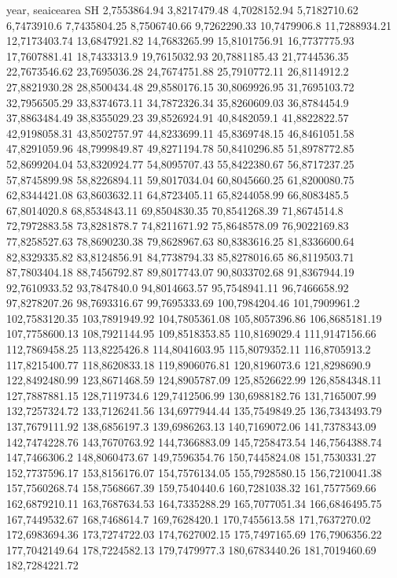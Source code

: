 year,    seaicearea SH
2,7553864.94
3,8217479.48
4,7028152.94
5,7182710.62
6,7473910.6
7,7435804.25
8,7506740.66
9,7262290.33
10,7479906.8
11,7288934.21
12,7173403.74
13,6847921.82
14,7683265.99
15,8101756.91
16,7737775.93
17,7607881.41
18,7433313.9
19,7615032.93
20,7881185.43
21,7744536.35
22,7673546.62
23,7695036.28
24,7674751.88
25,7910772.11
26,8114912.2
27,8821930.28
28,8500434.48
29,8580176.15
30,8069926.95
31,7695103.72
32,7956505.29
33,8374673.11
34,7872326.34
35,8260609.03
36,8784454.9
37,8863484.49
38,8355029.23
39,8526924.91
40,8482059.1
41,8822822.57
42,9198058.31
43,8502757.97
44,8233699.11
45,8369748.15
46,8461051.58
47,8291059.96
48,7999849.87
49,8271194.78
50,8410296.85
51,8978772.85
52,8699204.04
53,8320924.77
54,8095707.43
55,8422380.67
56,8717237.25
57,8745899.98
58,8226894.11
59,8017034.04
60,8045660.25
61,8200080.75
62,8344421.08
63,8603632.11
64,8723405.11
65,8244058.99
66,8083485.5
67,8014020.8
68,8534843.11
69,8504830.35
70,8541268.39
71,8674514.8
72,7972883.58
73,8281878.7
74,8211671.92
75,8648578.09
76,9022169.83
77,8258527.63
78,8690230.38
79,8628967.63
80,8383616.25
81,8336600.64
82,8329335.82
83,8124856.91
84,7738794.33
85,8278016.65
86,8119503.71
87,7803404.18
88,7456792.87
89,8017743.07
90,8033702.68
91,8367944.19
92,7610933.52
93,7847840.0
94,8014663.57
95,7548941.11
96,7466658.92
97,8278207.26
98,7693316.67
99,7695333.69
100,7984204.46
101,7909961.2
102,7583120.35
103,7891949.92
104,7805361.08
105,8057396.86
106,8685181.19
107,7758600.13
108,7921144.95
109,8518353.85
110,8169029.4
111,9147156.66
112,7869458.25
113,8225426.8
114,8041603.95
115,8079352.11
116,8705913.2
117,8215400.77
118,8620833.18
119,8906076.81
120,8196073.6
121,8298690.9
122,8492480.99
123,8671468.59
124,8905787.09
125,8526622.99
126,8584348.11
127,7887881.15
128,7119734.6
129,7412506.99
130,6988182.76
131,7165007.99
132,7257324.72
133,7126241.56
134,6977944.44
135,7549849.25
136,7343493.79
137,7679111.92
138,6856197.3
139,6986263.13
140,7169072.06
141,7378343.09
142,7474228.76
143,7670763.92
144,7366883.09
145,7258473.54
146,7564388.74
147,7466306.2
148,8060473.67
149,7596354.76
150,7445824.08
151,7530331.27
152,7737596.17
153,8156176.07
154,7576134.05
155,7928580.15
156,7210041.38
157,7560268.74
158,7568667.39
159,7540440.6
160,7281038.32
161,7577569.66
162,6879210.11
163,7687634.53
164,7335288.29
165,7077051.34
166,6846495.75
167,7449532.67
168,7468614.7
169,7628420.1
170,7455613.58
171,7637270.02
172,6983694.36
173,7274722.03
174,7627002.15
175,7497165.69
176,7906356.22
177,7042149.64
178,7224582.13
179,7479977.3
180,6783440.26
181,7019460.69
182,7284221.72

